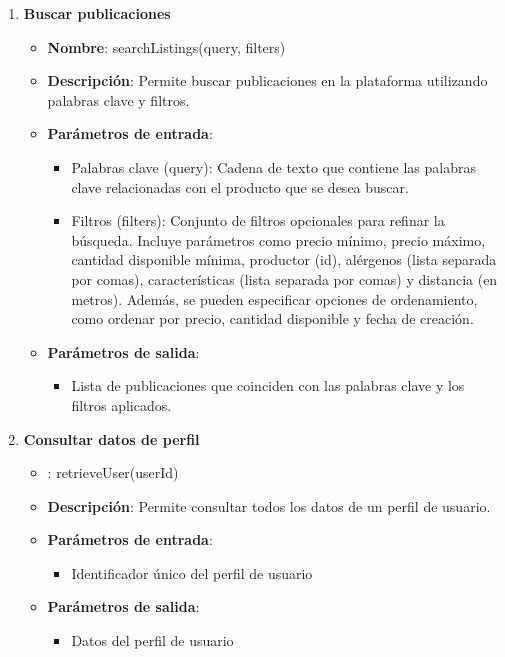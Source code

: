\begin{enumerate}[label=SOP-\protect\twodigits{\arabic*}:, align=left, leftmargin=*]
\item \textbf{Buscar publicaciones}
\begin{itemize}
\item \textbf{Nombre}: searchListings(query, filters)
\item \textbf{Descripción}: Permite buscar publicaciones en la plataforma utilizando palabras clave y filtros.
\item \textbf{Parámetros de entrada}:
\begin{itemize}
\item Palabras clave (query): Cadena de texto que contiene las palabras clave relacionadas con el producto que se desea buscar.
\item Filtros (filters): Conjunto de filtros opcionales para refinar la búsqueda. Incluye parámetros como precio mínimo, precio máximo, cantidad disponible mínima, productor (id), alérgenos (lista separada por comas), características (lista separada por comas) y distancia (en metros). Además, se pueden especificar opciones de ordenamiento, como ordenar por precio, cantidad disponible y fecha de creación.
\end{itemize}
\item \textbf{Parámetros de salida}:
\begin{itemize}
\item Lista de publicaciones que coinciden con las palabras clave y los filtros aplicados.
\end{itemize}
\end{itemize}

\item \textbf{Consultar datos de perfil}
\begin{itemize}
  \item {}: retrieveUser(userId)
\item \textbf{Descripción}: Permite consultar todos los datos de un perfil de usuario.
\item \textbf{Parámetros de entrada}:
\begin{itemize}
\item Identificador único del perfil de usuario
\end{itemize}
\item \textbf{Parámetros de salida}:
\begin{itemize}
\item Datos del perfil de usuario
\end{itemize}
\end{itemize}


\end{enumerate}
